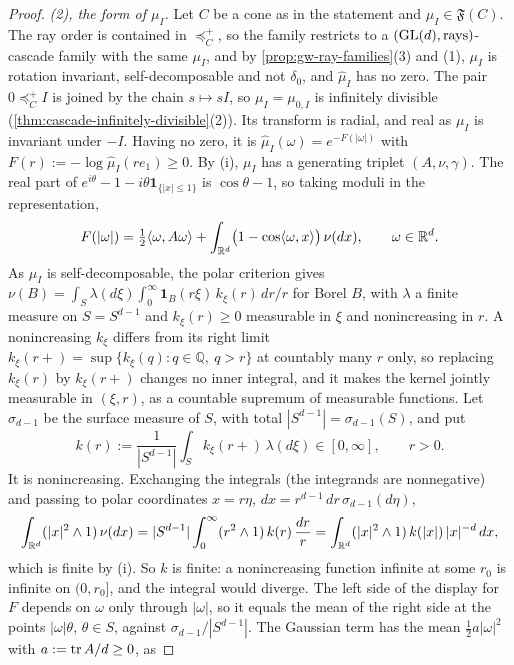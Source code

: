 \begin{proof}
\emph{(2), the form of $\mu_I$.} Let $C$ be a cone as in the statement and $\mu_I \in \mathfrak F(C)$. The ray order
is contained in $\preceq^+_C$, so the family restricts to a $(\mathrm{GL}(d), \text{rays})$-cascade family with the same
$\mu_I$, and by \ref{prop:gw-ray-families}(3) and (1), $\mu_I$ is rotation invariant, self-decomposable and not
$\delta_0$, and $\widehat\mu_I$ has no zero. The pair $0 \preceq^+_C I$ is joined by the chain $s \mapsto sI$, so
$\mu_I = \mu_{0,I}$ is infinitely divisible (\ref{thm:cascade-infinitely-divisible}(2)). Its transform is radial,
and real as $\mu_I$ is invariant under $-I$. Having no zero, it is $\widehat\mu_I(\omega) = e^{-F(|\omega|)}$ with
$F(r) := -\log\widehat\mu_I(re_1) \ge 0$. By (i), $\mu_I$ has a generating triplet $(A, \nu, \gamma)$.
The real part of $e^{i\theta} - 1 - i\theta\mathbf 1_{\{|x| \le 1\}}$ is $\cos\theta - 1$, so taking moduli in the
representation,
\[
  F(|\omega|) = \tfrac12\langle\omega, A\omega\rangle + \int_{\mathbb{R}^d}\bigl(1 - \cos\langle\omega,x\rangle\bigr)\,\nu(dx) ,
  \qquad \omega \in \mathbb{R}^d .
\]
As $\mu_I$ is self-decomposable, the polar criterion  gives
$\nu(B) = \int_S\lambda(d\xi)\int_0^\infty\mathbf 1_B(r\xi)\,k_\xi(r)\,dr/r$ for Borel $B$, with $\lambda$ a finite
measure on $S = S^{d-1}$ and $k_\xi(r) \ge 0$ measurable in $\xi$ and nonincreasing in $r$. A nonincreasing $k_\xi$
differs from its right limit $k_\xi(r+) = \sup\{k_\xi(q) : q \in \mathbb Q,\ q > r\}$ at countably many $r$ only,
so replacing $k_\xi(r)$ by $k_\xi(r+)$ changes no inner integral, and it makes the kernel jointly measurable in
$(\xi, r)$, as a countable supremum of measurable functions. Let $\sigma_{d-1}$ be the surface measure of $S$, with total
$|S^{d-1}| = \sigma_{d-1}(S)$, and put
\[
  k(r) := \frac{1}{|S^{d-1}|}\int_S k_\xi(r+)\,\lambda(d\xi) \in [0, \infty] , \qquad r > 0 .
\]
It is nonincreasing. Exchanging the integrals (the integrands are nonnegative) and passing to polar coordinates
$x = r\eta$, $dx = r^{d-1}\,dr\,\sigma_{d-1}(d\eta)$,
\[
  \int_{\mathbb{R}^d}(|x|^2 \wedge 1)\,\nu(dx) = |S^{d-1}|\int_0^\infty(r^2 \wedge 1)\,k(r)\,\frac{dr}{r}
  = \int_{\mathbb{R}^d}(|x|^2 \wedge 1)\,k(|x|)\,|x|^{-d}\,dx ,
\]
which is finite by (i). So $k$ is finite: a nonincreasing function infinite at some $r_0$ is infinite
on $(0, r_0]$, and the integral would diverge. The left side of the display for $F$ depends on $\omega$ only
through $|\omega|$, so it equals the mean of the right side at the points $|\omega|\theta$, $\theta \in S$, against
$\sigma_{d-1}/|S^{d-1}|$. The Gaussian term has the mean $\tfrac12 a|\omega|^2$ with $a := \operatorname{tr} A/d \ge 0$, as

\end{proof}
